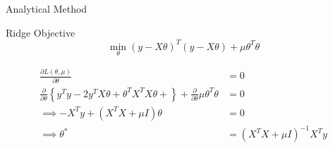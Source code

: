 \documentclass{beamer}
\begin{document}
\begin{frame}{Analytical Method}
\begin{tcolorbox}{Ridge Objective}
\vspace{-0.4cm}
$$
\min_\theta \left(y-X\theta\right)^T\left(y-X\theta\right)+ \mu\theta^T\theta
$$
\end{tcolorbox}
\begin{align*}
\frac{\partial L\left(\theta, \mu\right)}{\partial \theta} &= 0 \\ 
\frac{\partial}{\partial \theta}\left\lbrace y^Ty - 2y^TX\theta + \theta^TX^TX\theta +\right\rbrace +  \frac{\partial}{\partial \theta} \mu\theta^T\theta &= 0 \\
\implies -X^Ty + \left(X^TX + \mu I\right)\theta &= 0 \\
\implies \theta^* &= \left(X^TX + \mu I\right)^{-1}X^Ty
\end{align*}
\end{frame}
\end{document}
